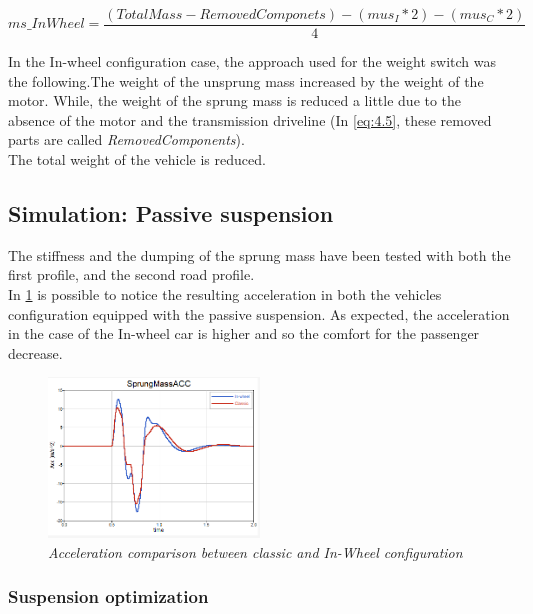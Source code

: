 \documentclass{article}
\numberwithin{equation}{section}
\numberwithin{figure}{section}
\numberwithin{table}{section}
\numberwithin{table}{section}
\begin{document}
\begin{equation}
    ms\_InWheel=\frac{(TotalMass-RemovedComponets)-(mus_I*2)-(mus_C*2)}{4}
    \label{eq:4.5}
\end{equation}


In the In-wheel configuration case, the approach used for the weight switch was the following.The weight of the unsprung mass increased by the weight of the motor. While, the weight of the sprung mass is reduced a little due to the absence of the motor and the transmission driveline (In \cref{eq:4.5}, these removed parts are called \emph{RemovedComponents}).\\ The total weight of the vehicle is reduced.\\


\subsection{Simulation: Passive suspension}
The stiffness and the dumping of the sprung mass have been tested with both the first profile, and the second road profile.\\
In \cref{fig:Passive comparison} is possible to notice the resulting acceleration in both the vehicles configuration equipped with the passive suspension. As expected, the acceleration in the case of the In-wheel car is higher and so the comfort for the passenger decrease.\\

\begin{figure}[H]
    \centering
    \includegraphics[width=0.5\textwidth]{Pictures/Passive (InWheelVsClassic).png}
    \caption{\emph{Acceleration comparison between classic and In-Wheel configuration}}
    \label{fig:Passive comparison}
\end{figure}

\subsubsection{Suspension optimization}
\end{document}
